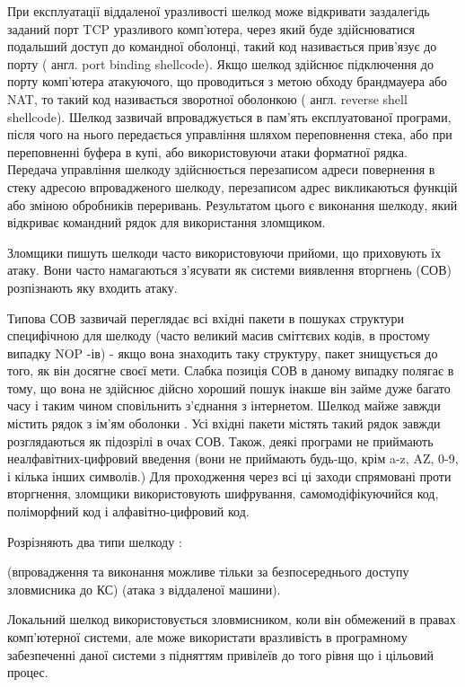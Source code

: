При експлуатації віддаленої уразливості шелкод може відкривати заздалегідь заданий порт TCP уразливого комп'ютера, через який буде здійснюватися подальший доступ до командної оболонці, такий код називається прив'язує до порту ( англ. port binding shellcode).  Якщо шелкод здійснює підключення до порту комп'ютера атакуючого, що проводиться з метою обходу брандмауера або NAT, то такий код називається зворотної оболонкою ( англ. reverse shell shellcode).
Шелкод зазвичай впроваджується в пам'ять експлуатованої програми, після чого на нього передається управління шляхом переповнення стека, або при переповненні буфера в купі, або використовуючи атаки форматної рядка.  Передача управління шелкоду здійснюється перезаписом адреси повернення в стеку адресою впровадженого шелкоду, перезаписом адрес викликаються функцій або зміною обробників переривань.  Результатом цього є виконання шелкоду, який відкриває командний рядок для використання зломщиком.

Зломщики пишуть шелкоди часто використовуючи прийоми, що приховують їх атаку.  Вони часто намагаються з'ясувати як системи виявлення вторгнень (СОВ) розпізнають яку входить атаку.  

Типова СОВ зазвичай переглядає всі вхідні пакети в пошуках структури специфічною для шелкоду (часто великий масив сміттєвих кодів, в простому випадку NOP -ів) -  якщо вона знаходить таку структуру, пакет знищується до того, як він досягне своєї мети.  Слабка позиція СОВ в даному випадку полягає в тому, що вона не здійснює дійсно хороший пошук інакше він займе дуже багато часу і таким чином сповільнить з'єднання з інтернетом. 
Шелкод майже завжди містить рядок з ім'ям оболонки .  Усі вхідні пакети містять такий рядок завжди розглядаються як підозрілі в очах СОВ.  Також, деякі програми не приймають неалфавітних-цифровий введення (вони не приймають будь-що, крім a-z, AZ, 0-9, і кілька інших символів.)
Для проходження через всі ці заходи спрямовані проти вторгнення, зломщики використовують шифрування, самомодіфікуючийся код, поліморфний код і алфавітно-цифровий код.

Розрізняють два типи шелкоду :
\begin{itemize}
 (впровадження та виконання можливе тільки за безпосереднього доступу зловмисника до КС)
 (атака з віддаленої машини). 
\end{itemize}

Локальний шелкод використовується зловмисником, коли він обмежений в правах комп’ютерної системи, але може використати вразливість в програмному забезпеченні даної системи з підняттям привілеїв до того рівня що і цільовий процес.

